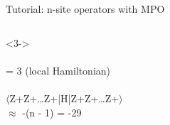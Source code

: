 \begin{frame}[fragile]{Tutorial: n-site operators with MPO}
\begin{columns}
\begin{column}{5.5cm}
\begin{onlyenv}<3->
~\\
~\\
= 3 (local Hamiltonian) \\
~\\
$\langle$Z+Z+…Z+|H|Z+Z+…Z+$\rangle$ \\
  $\approx$ -(n - 1) = -29
\end{onlyenv}

\end{column}

\end{columns}

\end{frame}
